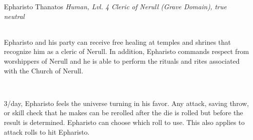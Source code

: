 \documentclass[10pt,twoside,twocolumn,openany]{book}
\begin{document}
\begin{monsterbox}{Epharisto Thanatos}
	\textit{Human, Lvl. 4 Cleric of Nerull (Grave Domain), true neutral}\\
	\hline
	\basics[%
	armorclass = 18,
	hitpoints  = 31 (4d8 + 12),
	speed      = 30 ft
	]
	\hline
	\stats[
    STR = \stat{9}, %
    DEX = \stat{14},
    CON = \stat{14},
    INT = \stat{12},
    WIS = \stat{18},
    CHA = \stat{12}
  ]
	\hline
	\details[%
  savingthrows = {WIS $+6$, CHA $+3$},
  skills = {Passive Perception $16$, Passive Investigation $11$},
	languages = {Common, 3 others},
	]
	\hline \\[1mm]
	\begin{monsteraction}
		Epharisto and his party can receive free healing at temples and shrines that recognize him as a cleric of Nerull. In addition, Epharisto commands respect from worshippers of Nerull and he is able to perform the rituals and rites associated with the Church of Nerull.
	\end{monsteraction}\\
  \begin{monsteraction}[Lucky]
    3/day, Epharisto feels the universe turning in his favor.
    Any attack, saving throw, or skill check that he makes can be rerolled after the die is rolled but before the result is determined.
    Epharisto can choose which roll to use.
    This also applies to attack rolls to hit Epharisto.
  \end{monsteraction}

\end{monsterbox}
\end{document}
